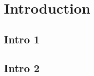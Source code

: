 %

\section{Introduction}\label{sec:2_1}
\subsection{Intro 1}\label{subsec:2_1_1}

\lipsum[10]

\subsection{Intro 2}\label{subsec:2_1_2}

\lipsum[10]
